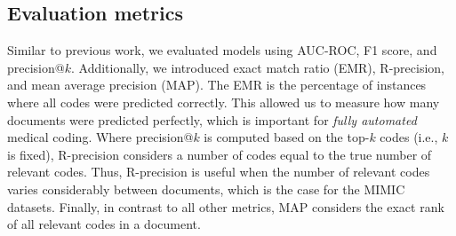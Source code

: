 {\subsection{Evaluation metrics}
\label{sec:metrics}
Similar to previous work, we evaluated models using AUC-ROC, F1 score, and precision@$k$. Additionally, we introduced exact match ratio (EMR), R-precision, and mean average precision (MAP). The EMR is the percentage of instances where all codes were predicted correctly. This allowed us to measure how many documents were predicted perfectly, which is important for \textit{fully automated} medical coding.
Where precision@$k$ is computed based on the top-$k$ codes (i.e., $k$ is fixed), R-precision considers a number of codes equal to the true number of relevant codes. Thus, R-precision is useful when the number of relevant codes varies considerably between documents, which is the case for the MIMIC datasets. Finally, in contrast to all other metrics, MAP considers the exact rank of all relevant codes in a document.


}
